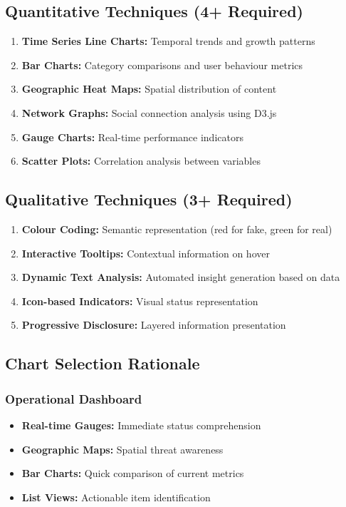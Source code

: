\documentclass[11pt,a4paper]{article}
\begin{document}
\subsection{Quantitative Techniques (4+ Required)}
\begin{enumerate}
    \item \textbf{Time Series Line Charts:} Temporal trends and growth patterns
    \item \textbf{Bar Charts:} Category comparisons and user behaviour metrics
    \item \textbf{Geographic Heat Maps:} Spatial distribution of content
    \item \textbf{Network Graphs:} Social connection analysis using D3.js
    \item \textbf{Gauge Charts:} Real-time performance indicators
    \item \textbf{Scatter Plots:} Correlation analysis between variables
\end{enumerate}

\subsection{Qualitative Techniques (3+ Required)}
\begin{enumerate}
    \item \textbf{Colour Coding:} Semantic representation (red for fake, green for real)
    \item \textbf{Interactive Tooltips:} Contextual information on hover
    \item \textbf{Dynamic Text Analysis:} Automated insight generation based on data
    \item \textbf{Icon-based Indicators:} Visual status representation
    \item \textbf{Progressive Disclosure:} Layered information presentation
\end{enumerate}

\subsection{Chart Selection Rationale}

\subsubsection{Operational Dashboard}
\begin{itemize}
    \item \textbf{Real-time Gauges:} Immediate status comprehension
    \item \textbf{Geographic Maps:} Spatial threat awareness
    \item \textbf{Bar Charts:} Quick comparison of current metrics
    \item \textbf{List Views:} Actionable item identification
\end{itemize}
\end{document}
